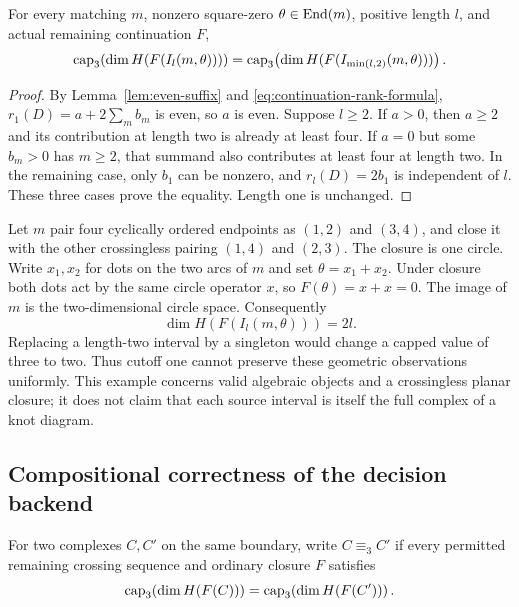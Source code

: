 \begin{theorem}\label{thm:geometric-cutoff}
For every matching $m$, nonzero square-zero $\theta\in\operatorname{End}(m)$, positive
length $l$, and actual remaining continuation $F$,
\begin{equation}\label{eq:length-two}
 \operatorname{cap}_3\!\left(\dim H(F(I_l(m,\theta)))\right)
 =
 \operatorname{cap}_3\!\left(\dim H(F(I_{\min(l,2)}(m,\theta)))\right).
\end{equation}
\end{theorem}

\begin{proof}
By Lemma~\ref{lem:even-suffix} and
\eqref{eq:continuation-rank-formula},
$r_1(D)=a+2\sum_m b_m$ is even, so $a$ is even. Suppose $l\ge2$.
If $a>0$, then $a\ge2$ and its contribution at length two is already
at least four. If $a=0$ but some $b_m>0$ has $m\ge2$, that summand
also contributes at least four at length two. In the remaining case,
only $b_1$ can be nonzero, and $r_l(D)=2b_1$ is independent of $l$.
These three cases prove the equality. Length one is unchanged.
\end{proof}

\begin{example}\label{ex:cutoff-sharp}
Let $m$ pair four cyclically ordered endpoints as
$(1,2)$ and $(3,4)$, and close it with the other crossingless pairing
$(1,4)$ and $(2,3)$. The closure is one circle. Write $x_1,x_2$ for dots
on the two arcs of $m$ and set $\theta=x_1+x_2$. Under closure both dots
act by the same circle operator $x$, so $F(\theta)=x+x=0$. The image
of $m$ is the two-dimensional circle space. Consequently
\[
 \dim H(F(I_l(m,\theta)))=2l.
\]
Replacing a length-two interval by a singleton would change a capped
value of three to two. Thus cutoff one cannot preserve these geometric
observations uniformly. This example concerns valid algebraic objects
and a crossingless planar closure; it does not claim that each source
interval is itself the full complex of a knot diagram.
\end{example}

\subsection{Compositional correctness of the decision backend}

\begin{definition}\label{def:continuation-equivalence}
For two complexes $C,C'$ on the same boundary, write $C\equiv_3 C'$ if
every permitted remaining crossing sequence and ordinary closure $F$
satisfies
\[
 \operatorname{cap}_3\!\left(\dim H(F(C))\right)
 =\operatorname{cap}_3\!\left(\dim H(F(C'))\right).
\]
\end{definition}

